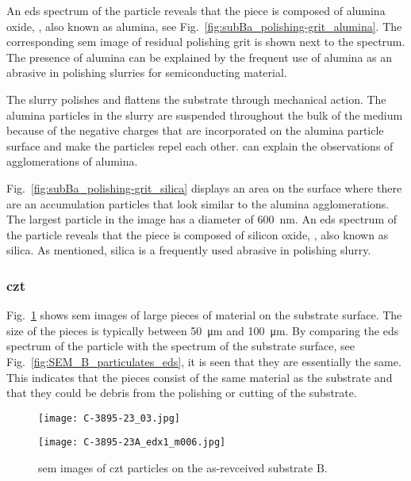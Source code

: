 An \ac{eds} spectrum of the particle reveals that the piece is composed of alumina oxide, , also known as alumina, see Fig.~\ref{fig:subBa_polishing-grit_alumina}. The corresponding \ac{sem} image of residual polishing grit is shown next to the spectrum. The presence of alumina can be explained by the frequent use of alumina as an abrasive in polishing slurries for semiconducting material.

The slurry polishes and flattens the substrate through mechanical action. The alumina particles in the slurry are suspended throughout the bulk of the medium because of the negative charges that are incorporated on the alumina particle surface and make the particles repel each other.  can explain the observations of agglomerations of alumina.

Fig.~\ref{fig:subBa_polishing-grit_silica} displays an area on the surface where there are an accumulation particles that look similar to the alumina agglomerations. The largest particle in the image has a diameter of \SI{600}{\nano\metre}. An \ac{eds} spectrum of the particle reveals that the piece is composed of silicon oxide, , also known as silica. As mentioned, silica is a frequently used abrasive in polishing slurry.

\subsubsection{\Ac{czt}}
Fig.~\ref{fig:SEM_B_particulates} shows \ac{sem} images of large pieces of material on the substrate surface. The size of the pieces is typically between \SI{50}{\micro\metre} and \SI{100}{\micro\metre}. By comparing the \ac{eds} spectrum of the particle with the spectrum of the substrate surface, see Fig.~\ref{fig:SEM_B_particulates_eds}, it is seen that they are essentially the same. This indicates that the pieces consist of the same material as the substrate and that they could be debris from the polishing or cutting of the substrate.

\begin{figure}[htbp]
    \centering
          \begin{minipage}[t]{0.49\linewidth}
            \centering
            \texttt{[image: C-3895-23\_03.jpg]}
          \end{minipage}
          \hfill
          \begin{minipage}[t]{0.49\linewidth}
            \centering
            \texttt{[image: C-3895-23A\_edx1\_m006.jpg]}
          \end{minipage}
        \caption[\Ac{sem} images of \ac{czt} particles on as-revceived substrate B.]{\Ac{sem} images of \ac{czt} particles on the as-revceived substrate B.}\label{fig:SEM_B_particulates}  
\end{figure}


